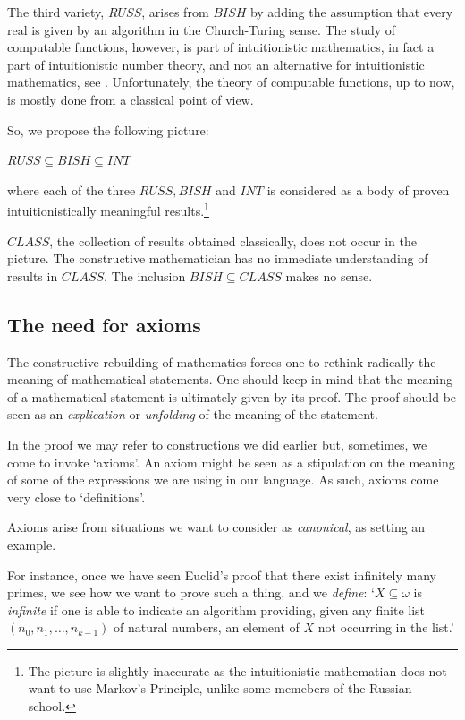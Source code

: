 \documentclass[a4paper]{amsart}
\theoremstyle{plain}
\begin{document}
The third variety,  $RUSS$, arises from $BISH$ by adding the assumption that every real is given by an algorithm in the Church-Turing sense. The study of computable functions, however, is part of  intuitionistic mathematics, in fact a part of intuitionistic number theory,  and not an alternative for intuitionistic mathematics, see \cite{veldman2011b}. Unfortunately, the theory of computable functions, up to now,  is mostly done from a classical point of view. 
  
  So, we propose the following picture:\begin{center}
  
  $RUSS\subseteq BISH\subseteq INT$ \end{center}
  
  where each of the three $RUSS, BISH$ and $INT$ is considered as a body of proven intuitionistically meaningful results.\footnote{The picture is slightly inaccurate as the intuitionistic mathematian does not want to use Markov's Principle, unlike some memebers of the Russian school.}
  
  $CLASS$, the collection of results obtained classically, does not occur in the picture. The constructive mathematician has no immediate understanding of results in $CLASS$. The inclusion $BISH\subseteq CLASS$ makes no sense. 
 
\subsection{The need for axioms} The constructive rebuilding of mathematics forces one to rethink radically the meaning of mathematical statements. One should keep in mind that the meaning of a mathematical statement is ultimately given by  its proof. The proof should be seen as an {\it explication} or {\it unfolding} of the meaning of the statement.

In the proof we may refer to constructions we did earlier but, sometimes,  we come to invoke `axioms'. An axiom might be seen as a stipulation on the meaning of some of the expressions we are using in our language. As such, axioms come very close to `definitions'. 

Axioms arise from situations we want to consider as {\it canonical}, as setting an example.

For instance, once we have seen Euclid's proof that there exist infinitely many primes, we see how  we want to prove such a thing, and we {\it define}: `$X\subseteq \omega$ is {\it infinite} if one is able to indicate an algorithm  providing, given any finite list $(n_0, n_1, \ldots, n_{k-1})$ of natural numbers, an element of $X$ not occurring in the list.'
\end{document}

